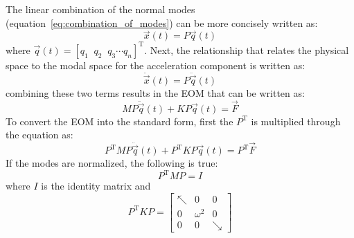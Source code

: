 \documentclass[12pt,letter]{article}
\begin{document}
	
		
	The linear combination of the normal modes (equation~\ref{eq:combination_of_modes}) can be more concisely written as:
	\begin{equation}
	\vec{x}(t) = P\vec{q}(t)
	\end{equation}
	where $\vec{q}(t) = [q_1 \; \; q_2 \; \; q_3 \cdots q_n]^{\text{T}}$. Next, the relationship that relates the physical space to the modal space for the acceleration component is written as:
	\begin{equation}
	\ddot{\vec{x}}(t) = P\ddot{\vec{q}}(t)
	\end{equation}
	combining these two terms results in the EOM that can be written as:
	\begin{equation}
	M P\ddot{\vec{q}}(t) + KP\vec{q}(t) = \vec{F}
	\end{equation}
	To convert the EOM into the standard form, first the $P^{\text{T}}$ is multiplied through the equation as:
	\begin{equation}
	P^{\text{T}} M P\ddot{\vec{q}}(t) + P^{\text{T}} K P\vec{q}(t) = P^{\text{T}} \vec{F}
	\end{equation}
	If the modes are normalized, the following is true: 
	\begin{equation}
	P^{\text{T}} M P = I
	\label{eq:modes_normalized}
	\end{equation}
	where $I$ is the identity matrix and 
	\begin{equation}
	P^{\text{T}} K P = \begin{bmatrix} \nwarrow & 0 & 0 \\  0  & \omega^2 & 0 \\  0  & 0 & \searrow \end{bmatrix}
	\end{equation}
	
\end{document}
